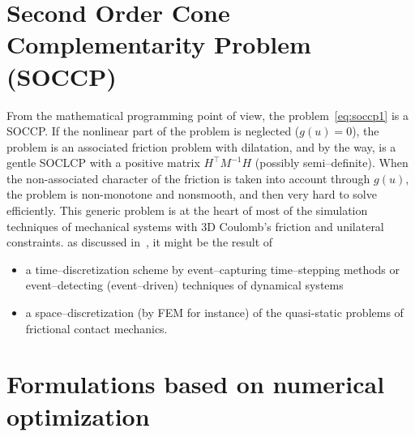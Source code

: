 \documentclass[11pt,a4paper]{article}
\begin{document}
\vspace{-0.5cm}\section{Second Order Cone Complementarity Problem (SOCCP)}
From the mathematical programming point of view, the problem~\eqref{eq:soccp1} is a SOCCP. If the nonlinear part of the problem is neglected ($g(u)=0$), the problem is an associated friction problem with dilatation, and by the way, is a gentle SOCLCP with a positive matrix $H^\top M^{-1} H$ (possibly semi--definite). When the non-associated character of the friction is taken into account through $g(u)$, the problem is non-monotone and nonsmooth, and then very hard to solve efficiently. 
This generic problem is at the heart of most of the simulation techniques of mechanical systems with 3D Coulomb's friction and unilateral constraints. as discussed in~\cite{Acary.Cadoux2013}, it might be the result of
\begin{itemize}
  \setlength\itemsep{0em}
\item a time--discretization scheme by event--capturing time--stepping methods or event--detecting (event--driven) techniques of dynamical systems
\item  a space--discretization (by FEM for instance) of the quasi-static problems of frictional contact mechanics.  
\end{itemize}



\vspace{-0.6cm}\section{Formulations based on numerical optimization}
  
\end{document}
